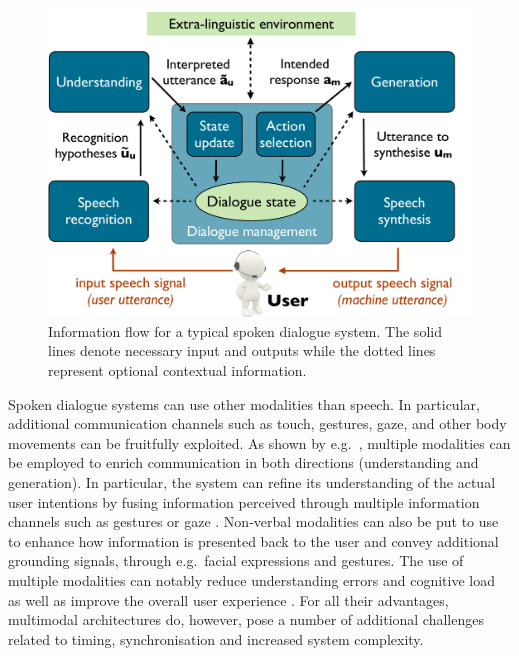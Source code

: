  \begin{figure}[h]
\centering
\vspace{5mm}
\includegraphics[scale=0.30]{imgs/architecture.pdf}
\vspace{5mm}
\caption{Information flow for a typical spoken dialogue system. The solid lines denote necessary input and outputs while the dotted lines represent optional contextual information.}
\label{fig:architecture}
\end{figure}

Spoken dialogue systems can use other modalities than speech.  In particular, additional communication channels such as touch, gestures, gaze, and other body movements can be fruitfully exploited.  As shown by e.g.\ \cite{smartkom}, multiple modalities can be employed to enrich communication in both directions (understanding and generation). In particular, the system can refine its understanding of the actual user intentions by fusing information perceived through multiple information channels such as gestures \citep{stiefelhagen2004} or gaze \citep{koller2012}.  Non-verbal modalities can also be put to use to enhance how information is presented back to the user and convey additional grounding signals, through e.g.\ facial expressions and gestures. The use of multiple modalities can notably reduce understanding errors and cognitive load \citep{oviatt2004we} as well as improve the overall user experience \citep{JokinenH06}.  For all their advantages, multimodal architectures do, however, pose a number of additional challenges related to timing, synchronisation \citep{DBLP:conf/hri/SalemKJ13} and increased system complexity. 

